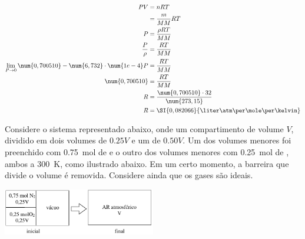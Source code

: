 \documentclass{IMTexam}
\begin{document}
\begin{questions}
        \begin{solution}
            \begin{align*}
                PV  & = nRT \\
                    & = \dfrac{m}{MM}RT \\
                P   & = \dfrac{\rho RT}{MM} \\
                \dfrac{P}{\rho} & = \dfrac{RT}{MM} \\
                \lim\limits_{P \to 0}{\num{0,700510} - \num{6,732}} \cdot \num{1e-4}P & = \dfrac{RT}{MM} \\
                \num{0,700510} & = \dfrac{RT}{MM} \\
                R & = \dfrac{\num{0,700510} \cdot 32}{\num{273,15}}\\
                R & = \SI{0,082066}{\liter\atm\per\mole\per\kelvin}
            \end{align*}
        \end{solution}

        \question Considere o sistema representado abaixo, onde um compartimento
        de volume $V$, dividido em dois volumes de $\num{0,25} V$ e um de
        $\num{0,50} V$. Um dos volumes menores foi preenchido com
        \SI{0,75}{\mole} de  e o outro dos volumes menores com \SI{0,25}{\mole} de
        , ambos a \SI{300}{\kelvin}, como ilustrado abaixo. Em um certo momento, a
        barreira que divide o volume é removida. Considere ainda que os gases
        são ideais.

        \begin{center}
            \includegraphics[width=0.5\textwidth]{2021-06-07-07-39-24.png}
        \end{center}

\end{questions}
\end{document}
